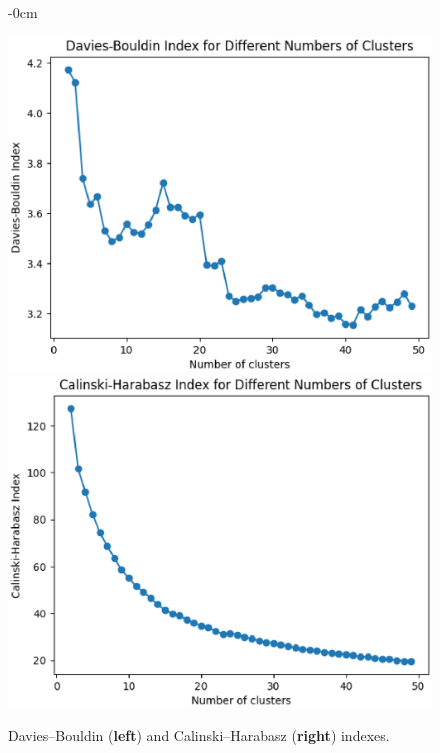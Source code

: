 \documentclass[jmse,review,accept,pdftex,moreauthors]{Definitions/mdpi}
\begin{document}
\begin{figure}[H]

\begin{adjustwidth}{-\extralength}{0cm}
\centering %

	\includegraphics[height=0.26\textheight, keepaspectratio]{pics/davis_bouldin.eps}
	\includegraphics[height=0.26\textheight, keepaspectratio]{pics/calinski.eps}
\end{adjustwidth}
	\caption{Davies--Bouldin (\textbf{left}) and Calinski--Harabasz (\textbf{right}) indexes.}\label{fig:fig10}
\end{figure}
\unskip
\end{document}
